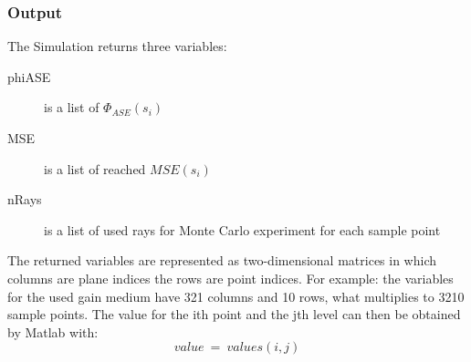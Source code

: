 \subsubsection{Output}
The Simulation returns three variables:
\begin{description}
  \item[phiASE] is a list of $\Phi_{ASE}(s_i)$ 
  \item[MSE] is a list of reached $MSE(s_i)$
  \item[nRays] is a list of used rays for Monte Carlo experiment for each sample point
    
\end{description}
The returned variables are represented as two-dimensional matrices in 
which columns are plane indices the rows are point indices.
For example: the variables for the used gain
medium have 321 columns and 10 rows, what multiplies to
3210 sample points. The value for the ith point and
the jth level can then be obtained by Matlab with:
\[value~=~values(i,j)\]
